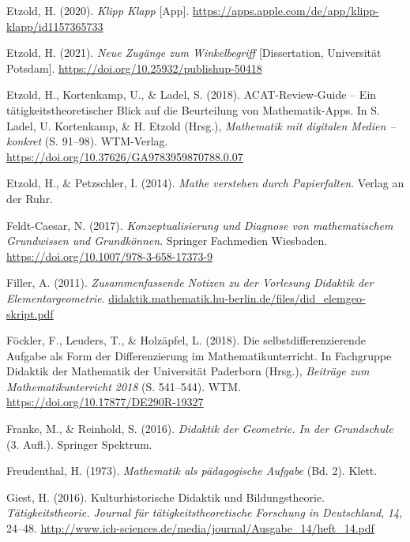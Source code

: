 \documentclass[
]{scrbook}
\newlength{\cslhangindent}
\newlength{\cslentryspacingunit} %
\newenvironment{CSLReferences}[2] %
 {%
  \setlength{\parindent}{0pt}
  \ifodd #1
  \let\oldpar\par
  \def\par{\hangindent=\cslhangindent\oldpar}
  \fi
  \setlength{\parskip}{#2\cslentryspacingunit}
 }%
 {}
\theoremstyle{definition}
\theoremstyle{definition}
\theoremstyle{definition}
\theoremstyle{definition}
\theoremstyle{remark}
\begin{document}
\begin{CSLReferences}{1}{0}
\leavevmode{}%
Etzold, H. (2020). \emph{Klipp {Klapp}} {[}App{]}. \url{https://apps.apple.com/de/app/klipp-klapp/id1157365733}

\leavevmode{}%
Etzold, H. (2021). \emph{Neue Zugänge zum Winkelbegriff} {[}Dissertation, Universität Potsdam{]}. \url{https://doi.org/10.25932/publishup-50418}

\leavevmode{}%
Etzold, H., Kortenkamp, U., \& Ladel, S. (2018). {ACAT}-{Review}-{Guide} -- {Ein} tätigkeitstheoretischer {Blick} auf die {Beurteilung} von {Mathematik}-{Apps}. In S. Ladel, U. Kortenkamp, \& H. Etzold (Hrsg.), \emph{Mathematik mit digitalen {Medien} -- konkret} (S. 91--98). WTM-Verlag. \url{https://doi.org/10.37626/GA9783959870788.0.07}

\leavevmode{}%
Etzold, H., \& Petzschler, I. (2014). \emph{Mathe verstehen durch {Papierfalten}}. Verlag an der Ruhr.

\leavevmode{}%
Feldt-Caesar, N. (2017). \emph{Konzeptualisierung und {Diagnose} von mathematischem {Grundwissen} und {Grundkönnen}}. Springer Fachmedien Wiesbaden. \url{https://doi.org/10.1007/978-3-658-17373-9}

\leavevmode{}%
Filler, A. (2011). \emph{Zusammenfassende {Notizen} zu der {Vorlesung} {Didaktik} der {Elementargeometrie}}. \href{https://didaktik.mathematik.hu-berlin.de/files/did_elemgeo-skript.pdf}{didaktik.mathematik.hu-berlin.de/files/did\_elemgeo-skript.pdf}

\leavevmode{}%
Föckler, F., Leuders, T., \& Holzäpfel, L. (2018). Die selbstdifferenzierende {Aufgabe} als {Form} der {Differenzierung} im {Mathematikunterricht}. In Fachgruppe Didaktik der Mathematik der Universität Paderborn (Hrsg.), \emph{Beiträge zum {Mathematikunterricht} 2018} (S. 541--544). WTM. \url{https://doi.org/10.17877/DE290R-19327}

\leavevmode{}%
Franke, M., \& Reinhold, S. (2016). \emph{Didaktik der {Geometrie}. {In} der {Grundschule}} (3. Aufl.). Springer Spektrum.

\leavevmode{}%
Freudenthal, H. (1973). \emph{Mathematik als pädagogische {Aufgabe}} (Bd. 2). Klett.

\leavevmode{}%
Giest, H. (2016). Kulturhistorische {Didaktik} und {Bildungstheorie}. \emph{Tätigkeitstheorie. Journal für tätigkeitstheoretische Forschung in Deutschland}, \emph{14}, 24--48. \url{http://www.ich-sciences.de/media/journal/Ausgabe_14/heft_14.pdf}


\end{CSLReferences}
\end{document}
